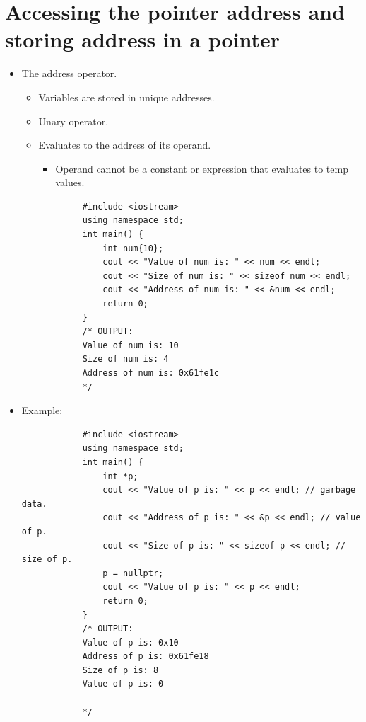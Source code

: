 \section{Accessing the pointer address and storing address in a pointer}
\begin{itemize}
    \item The address operator.
        \begin{itemize}
            \item Variables are stored in unique addresses.
            \item Unary operator.
            \item Evaluates to the address of its operand.
                \begin{itemize}
                    \item Operand cannot be a constant or expression that evaluates to temp values.
                \end{itemize}
        \end{itemize}
        \begin{verbatim}
            #include <iostream>
            using namespace std;
            int main() {
                int num{10};
                cout << "Value of num is: " << num << endl;
                cout << "Size of num is: " << sizeof num << endl;
                cout << "Address of num is: " << &num << endl;
                return 0;
            }
            /* OUTPUT:
            Value of num is: 10
            Size of num is: 4
            Address of num is: 0x61fe1c
            */
        \end{verbatim}
    
    \item Example:
        \begin{verbatim}
            #include <iostream>
            using namespace std;
            int main() {
                int *p;
                cout << "Value of p is: " << p << endl; // garbage data.
                cout << "Address of p is: " << &p << endl; // value of p.
                cout << "Size of p is: " << sizeof p << endl; // size of p.
                p = nullptr;
                cout << "Value of p is: " << p << endl;
                return 0;
            }
            /* OUTPUT:
            Value of p is: 0x10
            Address of p is: 0x61fe18
            Size of p is: 8
            Value of p is: 0

            */
        \end{verbatim}
\end{itemize}

